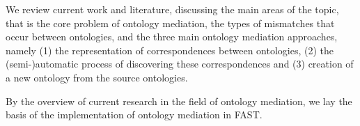 \documentclass{fast_latex}
\begin{document}
We review current work and literature, discussing the main areas of the
topic, that is the core problem of ontology mediation, the types of
mismatches that occur between ontologies, and the three main ontology
mediation approaches, namely (1) the representation of correspondences
between ontologies, (2) the (semi-)automatic process of discovering
these correspondences and (3) creation of a new ontology from the
source ontologies. 

By the overview of current research in the field of ontology mediation,
we lay the basis of the implementation of ontology mediation in FAST.

\newpage


\clearpage
\end{document}
